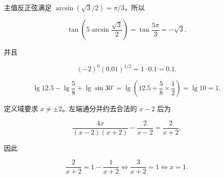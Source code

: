 \begin{answer}

主值反正弦满足 $\arcsin(\sqrt3/2)=\pi/3$，所以

\nopagebreak[4]
\[
\tan\left(5\arcsin\frac{\sqrt3}{2}\right)=\tan\frac{5\pi}{3}=-\sqrt3.
\]

并且

\nopagebreak[4]
\[
(-2)^0(0.01)^{1/2}=1\cdot0.1=0.1.
\]


\nopagebreak[4]
\[
\lg12.5-\lg\frac58+\lg\sin30^\circ
=\lg\left(12.5\div\frac58\times\frac12\right)=\lg10=1.
\]


定义域要求 $x\ne\pm2$。左端通分并约去合法的 $x-2$ 后为

\nopagebreak[4]
\[
\frac{4x}{(x-2)(x+2)}-\frac2{x-2}
=\frac{2}{x+2}.
\]

因此

\nopagebreak[4]
\[
\frac2{x+2}=1-\frac1{x+2}
\Longleftrightarrow \frac3{x+2}=1
\Longleftrightarrow x=1.
\]






\end{answer}
